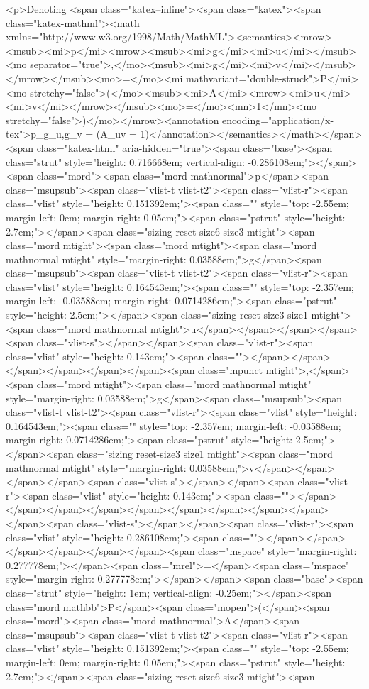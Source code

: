 <p>Denoting <span class="katex--inline"><span class="katex"><span class="katex-mathml"><math xmlns="http://www.w3.org/1998/Math/MathML"><semantics><mrow><msub><mi>p</mi><mrow><msub><mi>g</mi><mi>u</mi></msub><mo separator="true">,</mo><msub><mi>g</mi><mi>v</mi></msub></mrow></msub><mo>=</mo><mi mathvariant="double-struck">P</mi><mo stretchy="false">(</mo><msub><mi>A</mi><mrow><mi>u</mi><mi>v</mi></mrow></msub><mo>=</mo><mn>1</mn><mo stretchy="false">)</mo></mrow><annotation encoding="application/x-tex">p_{g_u,g_v} = (A_{uv} = 1)</annotation></semantics></math></span><span class="katex-html" aria-hidden="true"><span class="base"><span class="strut" style="height: 0.716668em; vertical-align: -0.286108em;"></span><span class="mord"><span class="mord mathnormal">p</span><span class="msupsub"><span class="vlist-t vlist-t2"><span class="vlist-r"><span class="vlist" style="height: 0.151392em;"><span class="" style="top: -2.55em; margin-left: 0em; margin-right: 0.05em;"><span class="pstrut" style="height: 2.7em;"></span><span class="sizing reset-size6 size3 mtight"><span class="mord mtight"><span class="mord mtight"><span class="mord mathnormal mtight" style="margin-right: 0.03588em;">g</span><span class="msupsub"><span class="vlist-t vlist-t2"><span class="vlist-r"><span class="vlist" style="height: 0.164543em;"><span class="" style="top: -2.357em; margin-left: -0.03588em; margin-right: 0.0714286em;"><span class="pstrut" style="height: 2.5em;"></span><span class="sizing reset-size3 size1 mtight"><span class="mord mathnormal mtight">u</span></span></span></span><span class="vlist-s">​</span></span><span class="vlist-r"><span class="vlist" style="height: 0.143em;"><span class=""></span></span></span></span></span></span><span class="mpunct mtight">,</span><span class="mord mtight"><span class="mord mathnormal mtight" style="margin-right: 0.03588em;">g</span><span class="msupsub"><span class="vlist-t vlist-t2"><span class="vlist-r"><span class="vlist" style="height: 0.164543em;"><span class="" style="top: -2.357em; margin-left: -0.03588em; margin-right: 0.0714286em;"><span class="pstrut" style="height: 2.5em;"></span><span class="sizing reset-size3 size1 mtight"><span class="mord mathnormal mtight" style="margin-right: 0.03588em;">v</span></span></span></span><span class="vlist-s">​</span></span><span class="vlist-r"><span class="vlist" style="height: 0.143em;"><span class=""></span></span></span></span></span></span></span></span></span></span><span class="vlist-s">​</span></span><span class="vlist-r"><span class="vlist" style="height: 0.286108em;"><span class=""></span></span></span></span></span></span><span class="mspace" style="margin-right: 0.277778em;"></span><span class="mrel">=</span><span class="mspace" style="margin-right: 0.277778em;"></span></span><span class="base"><span class="strut" style="height: 1em; vertical-align: -0.25em;"></span><span class="mord mathbb">P</span><span class="mopen">(</span><span class="mord"><span class="mord mathnormal">A</span><span class="msupsub"><span class="vlist-t vlist-t2"><span class="vlist-r"><span class="vlist" style="height: 0.151392em;"><span class="" style="top: -2.55em; margin-left: 0em; margin-right: 0.05em;"><span class="pstrut" style="height: 2.7em;"></span><span class="sizing reset-size6 size3 mtight"><span 